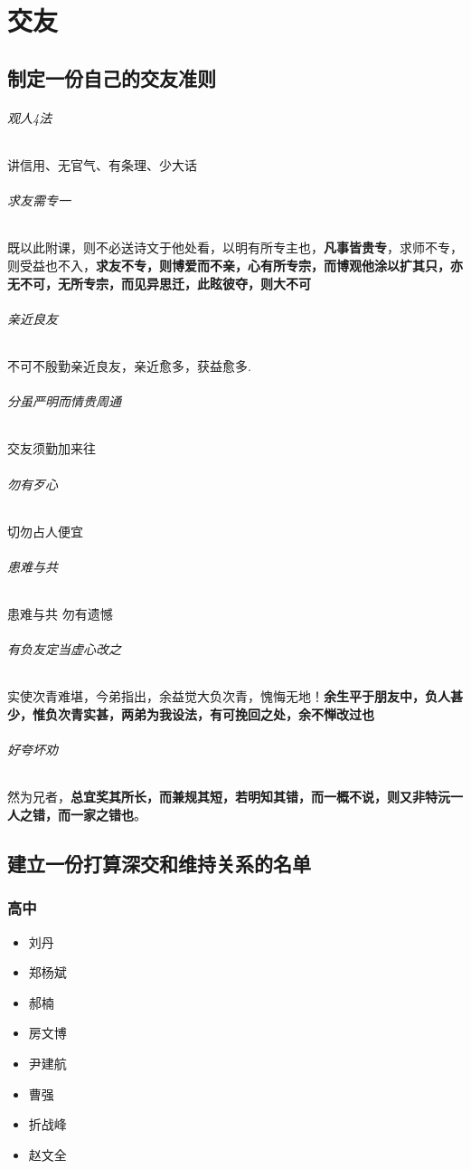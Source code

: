 \documentclass[UTF8,a4paper,8pt]{ctexbook}
\begin{document}
\chapter{交友}  
	\section{制定一份自己的交友准则}
		  \subparagraph{观人4法} 讲信用、无官气、有条理、少大话
		  
		  \subparagraph{求友需专一} 既以此附课，则不必送诗文于他处看，以明有所专主也，\textbf{凡事皆贵专}，求师不专，则受益也不入，\textbf{求友不专，则博爱而不亲，心有所专宗，而博观他涂以扩其只，亦无不可，无所专宗，而见异思迁，此眩彼夺，则大不可}
		  
		  \subparagraph{亲近良友} 不可不殷勤亲近良友，亲近愈多，获益愈多.
		  
		  \subparagraph{分虽严明而情贵周通} 交友须勤加来往
			
		  \subparagraph{勿有歹心} 切勿占人便宜
			
		  \subparagraph{患难与共} 患难与共 勿有遗憾
		  
		  \subparagraph{有负友定当虚心改之}实使次青难堪，今弟指出，余益觉大负次青，愧悔无地！\textbf{余生平于朋友中，负人甚少，惟负次青实甚，两弟为我设法，有可挽回之处，余不惮改过也}
		  
		 \subparagraph{好夸坏劝}然为兄者，\textbf{总宜奖其所长，而兼规其短，若明知其错，而一概不说，则又非特沅一人之错，而一家之错也}。
		  
    \section{建立一份打算深交和维持关系的名单}
	    \subsection{高中}
			\begin{itemize}
				 \item  刘丹
				 \item  郑杨斌
				 \item  郝楠
				 \item  房文博
				 \item  尹建航
				 \item  曹强
				 \item  折战峰
				 \item  赵文全
			\end{itemize}
\end{document}

